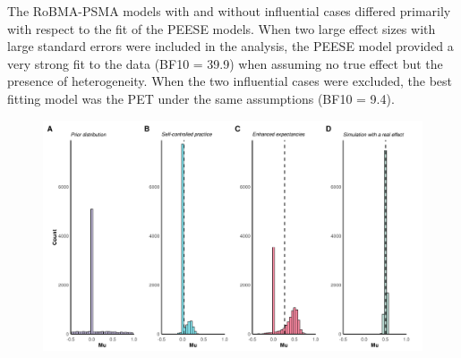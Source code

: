 \documentclass[
  doc, donotrepeattitle,floatsintext]{apa7}
\begin{document}
The RoBMA-PSMA models with and without influential cases differed primarily with respect to the fit of the PEESE models. When two large effect sizes with large standard errors were included in the analysis, the PEESE model provided a very strong fit to the data (BF10 = 39.9) when assuming no true effect but the presence of heterogeneity. When the two influential cases were excluded, the best fitting model was the PET under the same assumptions (BF10 = 9.4).

\clearpage

\begin{figure}

{\centering \includegraphics{../../figs/fig1} 

}


\end{figure}
\end{document}
